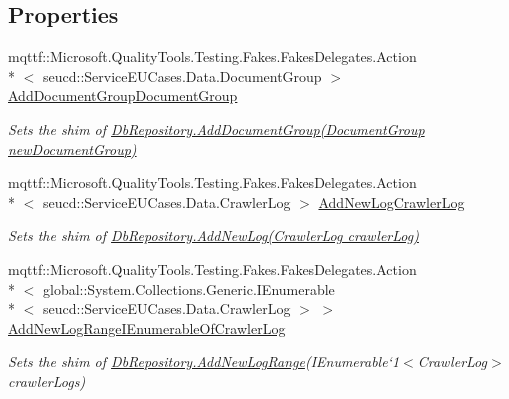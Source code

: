 \subsection*{Properties}
\begin{DoxyCompactItemize}
\item 
mqttf\-::\-Microsoft.\-Quality\-Tools.\-Testing.\-Fakes.\-Fakes\-Delegates.\-Action\\*
$<$ seucd\-::\-Service\-E\-U\-Cases.\-Data.\-Document\-Group $>$ \hyperlink{class_service_e_u_cases_1_1_repositories_1_1_fakes_1_1_shim_db_repository_a489137bf40a57360d5d33265a2655246}{Add\-Document\-Group\-Document\-Group}
\begin{DoxyCompactList}\small\item\em Sets the shim of \hyperlink{class_service_e_u_cases_1_1_repositories_1_1_db_repository_ae4b034e9103223b0b8bb78383032d466}{Db\-Repository.\-Add\-Document\-Group(\-Document\-Group new\-Document\-Group)}\end{DoxyCompactList}\item 
mqttf\-::\-Microsoft.\-Quality\-Tools.\-Testing.\-Fakes.\-Fakes\-Delegates.\-Action\\*
$<$ seucd\-::\-Service\-E\-U\-Cases.\-Data.\-Crawler\-Log $>$ \hyperlink{class_service_e_u_cases_1_1_repositories_1_1_fakes_1_1_shim_db_repository_a901999a4658a62b07376ee98f3b40942}{Add\-New\-Log\-Crawler\-Log}
\begin{DoxyCompactList}\small\item\em Sets the shim of \hyperlink{class_service_e_u_cases_1_1_repositories_1_1_db_repository_a99421faf8de77dc789effe40a7b93113}{Db\-Repository.\-Add\-New\-Log(\-Crawler\-Log crawler\-Log)}\end{DoxyCompactList}\item 
mqttf\-::\-Microsoft.\-Quality\-Tools.\-Testing.\-Fakes.\-Fakes\-Delegates.\-Action\\*
$<$ global\-::\-System.\-Collections.\-Generic.\-I\-Enumerable\\*
$<$ seucd\-::\-Service\-E\-U\-Cases.\-Data.\-Crawler\-Log $>$ $>$ \hyperlink{class_service_e_u_cases_1_1_repositories_1_1_fakes_1_1_shim_db_repository_ade66b2a325a5ba4e5556a978ca31118a}{Add\-New\-Log\-Range\-I\-Enumerable\-Of\-Crawler\-Log}
\begin{DoxyCompactList}\small\item\em Sets the shim of \hyperlink{class_service_e_u_cases_1_1_repositories_1_1_db_repository_a9af7cfcd5421e7ffb403430487138ae5}{Db\-Repository.\-Add\-New\-Log\-Range}(I\-Enumerable`1$<$Crawler\-Log$>$ crawler\-Logs)\end{DoxyCompactList}\item 

\end{DoxyCompactItemize}
